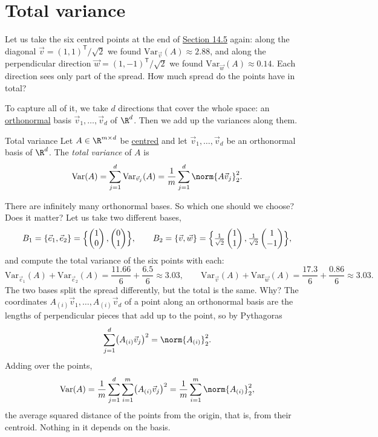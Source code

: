 \documentclass[a4paper,12pt,oneside]{report}
\begin{document}
\section{Total variance}
\label{sec:total-variance}

Let us take the six centred points at the end of
\hyperref[sec:variance-direction]{Section 14.5} again: along the
diagonal $\vec v=(1,1)^{\mathsf T}/\sqrt2$ we found
$\mathrm{Var}_{\vec v}(A)\approx2.88$, and along the perpendicular
direction $\vec w=(1,-1)^{\mathsf T}/\sqrt2$ we found
$\mathrm{Var}_{\vec w}(A)\approx0.14$. Each direction sees only part
of the spread. How much spread do the points have in total?

To capture all of it, we take $d$ directions that cover the whole
space: an \hyperref[def:orthonormal]{orthonormal} basis $\vec v_1,\ldots,\vec v_d$ of $\R^d$. Then
we add up the variances along them.

\begin{frameddefn}{Total variance}
\label{def:total-variance}
Let $A\in\R^{m\times d}$ be \hyperref[sec:centring]{centred} and let $\vec v_1,\ldots,\vec v_d$
be an orthonormal basis of $\R^d$. The \emph{total variance} of $A$ is
\[
  \mathrm{Var}(A)=\sum_{j=1}^{d}\mathrm{Var}_{\vec v_j}(A)
  =\frac1m\sum_{j=1}^{d}\norm{A\vec v_j}_2^2 .
\]
\end{frameddefn}

There are infinitely many orthonormal bases. So which one should we choose? Does it matter? Let us take two different bases,
\[
  B_1=\{\vec e_1,\vec e_2\}
    =\Bigl\{\begin{pmatrix}1\\0\end{pmatrix},\begin{pmatrix}0\\1\end{pmatrix}\Bigr\},
  \qquad
  B_2=\{\vec v,\vec w\}
    =\Bigl\{\tfrac1{\sqrt2}\begin{pmatrix}1\\1\end{pmatrix},\tfrac1{\sqrt2}\begin{pmatrix}1\\-1\end{pmatrix}\Bigr\},
\]
and compute the total variance of the six points with each:
\[
  \mathrm{Var}_{\vec e_1}(A)+\mathrm{Var}_{\vec e_2}(A)
  =\frac{11.66}{6}+\frac{6.5}{6}\approx3.03,
  \qquad
  \mathrm{Var}_{\vec v}(A)+\mathrm{Var}_{\vec w}(A)
  =\frac{17.3}{6}+\frac{0.86}{6}\approx3.03 .
\]
The two bases split the spread differently, but the total is the
same. Why? The coordinates $A_{(i)}\vec v_1,\ldots,A_{(i)}\vec v_d$ of
a point along an orthonormal basis are the lengths of perpendicular
pieces that add up to the point, so by Pythagoras
\[
  \sum_{j=1}^{d}\bigl(A_{(i)}\vec v_j\bigr)^2=\norm{A_{(i)}}_2^2 .
\]
Adding over the points,
\[
  \mathrm{Var}(A)=\frac1m\sum_{j=1}^{d}\sum_{i=1}^{m}\bigl(A_{(i)}\vec v_j\bigr)^2
  =\frac1m\sum_{i=1}^{m}\norm{A_{(i)}}_2^2,
\]
the average squared distance of the points from the origin, that is,
from their centroid. Nothing in it depends on the basis.
\end{document}
